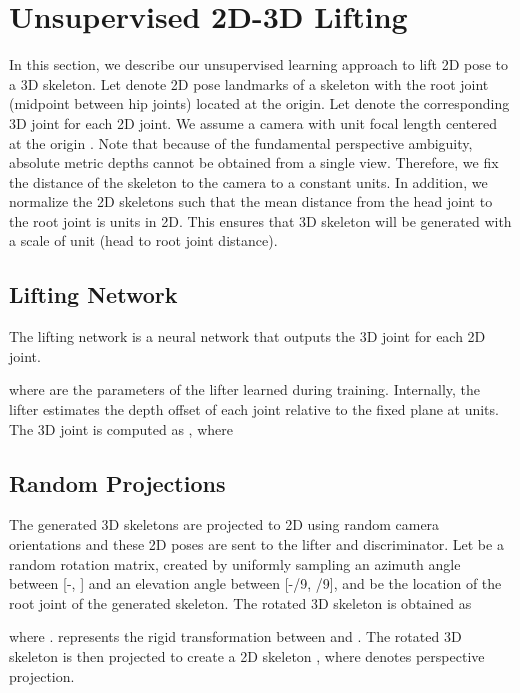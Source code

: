 \documentclass[10pt,twocolumn,letterpaper]{article}
\begin{document}
 
\section{Unsupervised 2D-3D Lifting}
\label{sect:algo}

In this section, we describe our unsupervised learning approach to lift 2D pose to a 3D skeleton. Let  denote  2D pose landmarks of a skeleton with the root joint (midpoint between hip joints) located at the origin. Let  denote the corresponding 3D joint for each 2D joint. We assume a camera with unit focal length centered at the origin . Note that because of the fundamental perspective ambiguity, absolute metric depths cannot be obtained from a single view. Therefore, we fix the distance of the skeleton to the camera to a constant  units. In addition, we normalize the 2D skeletons such that the mean distance from the head joint to the root joint is  units in 2D. This ensures that 3D skeleton will be generated with a scale of  unit (head to root joint distance).

\subsection{Lifting Network}
\label{subsect:adversarial-algo}
The lifting network  is a neural network that outputs the 3D joint for each 2D joint.

where  are the parameters of the lifter learned during training. Internally, the lifter estimates
the depth offset  of each joint relative to the fixed plane at  units. The 3D joint is computed as , where


\subsection{Random Projections}
\label{subsect:random_projection-algo}
The generated 3D skeletons are projected to 2D using random camera orientations and these 2D poses are sent to the lifter and discriminator. Let  be a random rotation matrix, created by uniformly sampling an azimuth angle between [-, ] and an elevation angle between [-/9, /9], and  be the location of the root joint of the generated skeleton. The rotated 3D skeleton  is obtained as


where .  represents the rigid transformation between  and . The rotated 3D skeleton  is then projected to create a 2D skeleton , where  denotes perspective projection.
\end{document}
